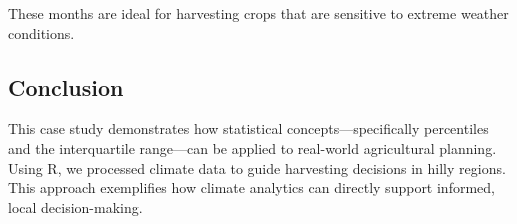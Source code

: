 These months are ideal for harvesting crops that are sensitive to extreme weather conditions.

\subsection*{Conclusion}
This case study demonstrates how statistical concepts—specifically percentiles and the interquartile range—can be applied to real-world agricultural planning. Using R, we processed climate data to guide harvesting decisions in hilly regions. This approach exemplifies how climate analytics can directly support informed, local decision-making.


